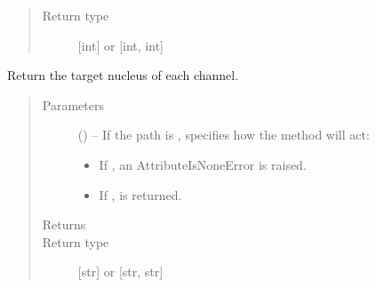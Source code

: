 \documentclass[letterpaper,10pt,english]{sphinxmanual}
\begin{document}
\begin{fulllineitems}
\begin{fulllineitems}
\begin{quote}
\begin{description}
\item[{Return type}] \leavevmode
\sphinxAtStartPar
{[}int{]} or {[}int, int{]}

\end{description}\end{quote}

\end{fulllineitems}


\begin{fulllineitems}
\label{\detokenize{references/core:nmrespy.core.Estimator.get_nucleus}}
\sphinxAtStartPar
Return the target nucleus of each channel.
\begin{quote}\begin{description}
\item[{Parameters}] \leavevmode
\sphinxAtStartPar
{} (\sphinxstyleliteralemphasis{\sphinxupquote{, }}) – 
\sphinxAtStartPar
If the path is ,  specifies how the method will act:
\begin{itemize}
\item {} 
\sphinxAtStartPar
If , an AttributeIsNoneError is raised.

\item {} 
\sphinxAtStartPar
If ,  is returned.

\end{itemize}


\item[{Returns}] \leavevmode
\sphinxAtStartPar
{}

\item[{Return type}] \leavevmode
\sphinxAtStartPar
{[}str{]} or {[}str, str{]}

\end{description}\end{quote}

\end{fulllineitems}



\end{fulllineitems}
\end{document}
